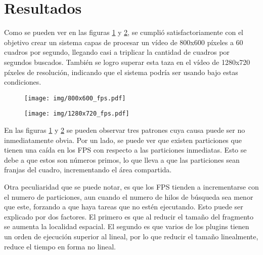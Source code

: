 \section{Resultados}

Como se pueden ver en las figuras \ref{800fps} y \ref{1280fps}, se cumplió
satisfactoriamente con el objetivo crear un sistema capas de procesar un vídeo
de 800x600 píxeles a 60 cuadros por segundo, llegando casi a triplicar la
cantidad de cuadros por segundos buscados. También se logro superar esta taza en
el vídeo de 1280x720 píxeles de resolución, indicando que el sistema podría ser
usando bajo estas condiciones.

\begin{figure}[h]

	\texttt{[image: img/800x600\_fps.pdf]}
	\caption{}
	\label{800fps}

\end{figure}

\begin{figure}[h]

	\texttt{[image: img/1280x720\_fps.pdf]}
	\caption{}
	\label{1280fps}

\end{figure}

En las figuras \ref{800fps} y \ref{1280fps} se pueden observar tres patrones
cuya causa puede ser no inmediatamente obvia. Por un lado, se puede ver que
existen particiones que tienen una caída en los FPS con respecto a las
particiones inmediatas. Esto se debe a que estos son números primos, lo que
lleva a que las particiones sean franjas del cuadro, incrementando el área
compartida.

Otra peculiaridad que se puede notar, es que los FPS tienden a incrementarse con
el numero de particiones, aun cuando el numero de hilos de búsqueda sea menor
que este, forzando a que haya tareas que no estén ejecutando. Esto puede ser
explicado por dos factores. El primero es que al reducir el tamaño del fragmento
se aumenta la localidad espacial. El segundo es que varios de los plugins tienen
un orden de ejecución superior al lineal, por lo que reducir el tamaño
linealmente, reduce el tiempo en forma no lineal.

